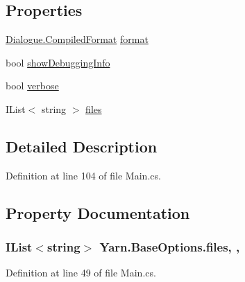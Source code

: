 \subsection*{Properties}
\begin{DoxyCompactItemize}
\item 
\hyperlink{a00094_a903f18cdcc66c28ceab5a43c41fe074d}{Dialogue.\-Compiled\-Format} \hyperlink{a00057_a9904ccfb1b0ff64df415c4fc9fe6eb1c}{format}
\item 
bool \hyperlink{a00043_a89964ea17bd19caf00cb5bff563ed01c}{show\-Debugging\-Info}
\item 
bool \hyperlink{a00043_ada4d83d1756918f362d55f6649b82b17}{verbose}
\item 
I\-List$<$ string $>$ \hyperlink{a00043_aa93cbb1bc1d5328e0a417012621e92d2}{files}
\end{DoxyCompactItemize}


\subsection{Detailed Description}


Definition at line 104 of file Main.\-cs.



\subsection{Property Documentation}
\hypertarget{a00043_aa93cbb1bc1d5328e0a417012621e92d2}{
\subsubsection[{files}]{\setlength{\rightskip}{0pt plus 5cm}I\-List$<$string$>$ Yarn.\-Base\-Options.\-files\hspace{0.3cm}{\ttfamily [get]}, {\ttfamily [set]}, {\ttfamily [inherited]}}}\label{a00043_aa93cbb1bc1d5328e0a417012621e92d2}


Definition at line 49 of file Main.\-cs.




